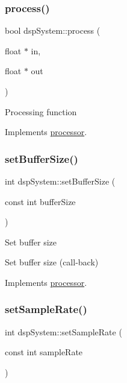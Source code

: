 \subsubsection{\texorpdfstring{process()}{process()}}
{\footnotesize\ttfamily bool dsp\+System\+::process (\begin{DoxyParamCaption}\item[{float $\ast$}]{in,  }\item[{float $\ast$}]{out }\end{DoxyParamCaption})\hspace{0.3cm}{\ttfamily [virtual]}}

Processing function 

Implements \hyperlink{classprocessor_a208b7490862424d1a487aa31b3520116}{processor}.

\mbox{\label{classdspSystem_aefaba04b05be939878a29de212c43d72}} 
\subsubsection{\texorpdfstring{set\+Buffer\+Size()}{setBufferSize()}}
{\footnotesize\ttfamily int dsp\+System\+::set\+Buffer\+Size (\begin{DoxyParamCaption}\item[{const int}]{buffer\+Size }\end{DoxyParamCaption})\hspace{0.3cm}{\ttfamily [virtual]}}

Set buffer size

Set buffer size (call-\/back) 

Implements \hyperlink{classprocessor_a1101feba5276acdadae9cd2d9b202421}{processor}.

\mbox{\label{classdspSystem_ac6fe7760ea257a9763556752f2017120}} 
\subsubsection{\texorpdfstring{set\+Sample\+Rate()}{setSampleRate()}}
{\footnotesize\ttfamily int dsp\+System\+::set\+Sample\+Rate (\begin{DoxyParamCaption}\item[{const int}]{sample\+Rate }\end{DoxyParamCaption})\hspace{0.3cm}{\ttfamily [virtual]}}

